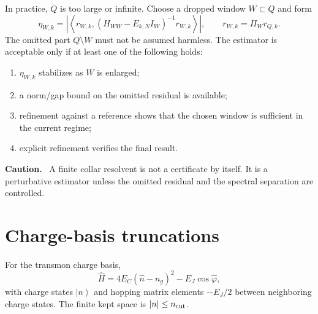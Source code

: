 \documentclass[11pt,a4paper]{article}
\newcommand{\ket}[1]{\left|#1\right\rangle}
\newcommand{\abs}[1]{\left|#1\right|}
\newcommand{\Hhat}{\widehat H}
\newcommand{\ncut}{n_{\rm cut}}
\newcommand{\EJ}{E_J}
\newcommand{\EC}{E_C}
\newenvironment{caution}{\begin{shaded}\noindent\textbf{Caution.}\ }{\end{shaded}}
\begin{document}
In practice, $Q$ is too large or infinite.  Choose a dropped window $W\subset Q$ and form
\begin{equation}
  \eta_{W,k}=\left|\left\langle r_{W,k},(H_{WW}-E_{k,N}I_W)^{-1}r_{W,k}\right\rangle\right|,
  \qquad r_{W,k}=\Pi_W r_{Q,k}.
\end{equation}
The omitted part $Q\setminus W$ must not be assumed harmless.  The estimator is acceptable only if at least one of the following holds:
\begin{enumerate}
\item $\eta_{W,k}$ stabilizes as $W$ is enlarged;
\item a norm/gap bound on the omitted residual is available;
\item refinement against a reference shows that the chosen window is sufficient in the current regime;
\item explicit refinement verifies the final result.
\end{enumerate}

\begin{caution}
A finite collar resolvent is not a certificate by itself.  It is a perturbative estimator unless the omitted residual and the spectral separation are controlled.
\end{caution}

\section{Charge-basis truncations}
\label{sec:charge}

For the transmon charge basis,
\begin{equation}
  \Hhat=4\EC(\hat n-n_g)^2-\EJ\cos\hat\varphi,
\end{equation}
with charge states $\ket n$ and hopping matrix elements $-\EJ/2$ between neighboring charge states.  The finite kept space is $\abs n\le \ncut$.
\end{document}
